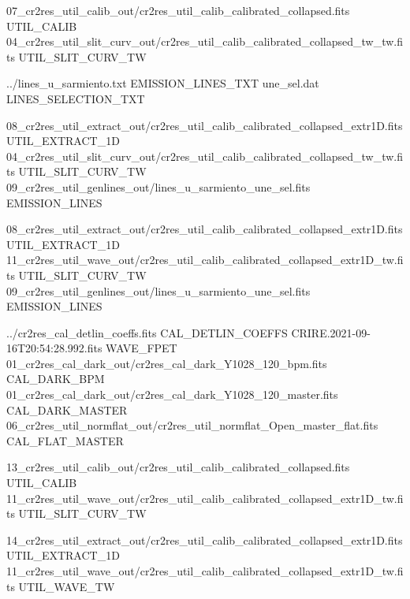 \begin{shell}[fontsize=\footnotesize]
07_cr2res_util_calib_out/cr2res_util_calib_calibrated_collapsed.fits UTIL_CALIB
04_cr2res_util_slit_curv_out/cr2res_util_calib_calibrated_collapsed_tw_tw.fits UTIL_SLIT_CURV_TW

../lines_u_sarmiento.txt EMISSION_LINES_TXT
une_sel.dat LINES_SELECTION_TXT

08_cr2res_util_extract_out/cr2res_util_calib_calibrated_collapsed_extr1D.fits UTIL_EXTRACT_1D
04_cr2res_util_slit_curv_out/cr2res_util_calib_calibrated_collapsed_tw_tw.fits UTIL_SLIT_CURV_TW
09_cr2res_util_genlines_out/lines_u_sarmiento_une_sel.fits EMISSION_LINES

08_cr2res_util_extract_out/cr2res_util_calib_calibrated_collapsed_extr1D.fits UTIL_EXTRACT_1D
11_cr2res_util_wave_out/cr2res_util_calib_calibrated_collapsed_extr1D_tw.fits UTIL_SLIT_CURV_TW
09_cr2res_util_genlines_out/lines_u_sarmiento_une_sel.fits EMISSION_LINES

../cr2res_cal_detlin_coeffs.fits CAL_DETLIN_COEFFS
CRIRE.2021-09-16T20:54:28.992.fits      WAVE_FPET
01_cr2res_cal_dark_out/cr2res_cal_dark_Y1028_120_bpm.fits CAL_DARK_BPM
01_cr2res_cal_dark_out/cr2res_cal_dark_Y1028_120_master.fits CAL_DARK_MASTER
06_cr2res_util_normflat_out/cr2res_util_normflat_Open_master_flat.fits CAL_FLAT_MASTER

13_cr2res_util_calib_out/cr2res_util_calib_calibrated_collapsed.fits UTIL_CALIB
11_cr2res_util_wave_out/cr2res_util_calib_calibrated_collapsed_extr1D_tw.fits UTIL_SLIT_CURV_TW

14_cr2res_util_extract_out/cr2res_util_calib_calibrated_collapsed_extr1D.fits UTIL_EXTRACT_1D
11_cr2res_util_wave_out/cr2res_util_calib_calibrated_collapsed_extr1D_tw.fits UTIL_WAVE_TW
\end{shell}


